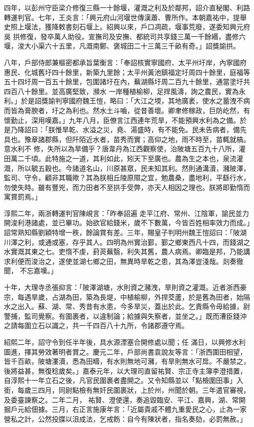 \begin{pinyinscope}
 四年，以彭州守臣梁介修復三縣一十餘堰，灌溉之利及於鄰邦，詔介直秘閣、利路轉運判官。七年，王炎言：「興元府山河堰世傳漢蕭、曹所作。本朝嘉祐中，提舉史照上堰法，獲降敕書刻石堰上。紹興以來，戶口凋疏，堰事荒廢，遂委知興元府吳
 拱修復，發卒萬人助役。宣撫司及安撫、都統司共享錢三萬一千餘緡，盡修六堰，浚大小渠六十五里，凡溉南鄭、褒城田二十三萬三千畝有奇。」詔獎諭拱。



 八年，戶部侍郎兼樞密都承旨葉衡言：「奉詔核實寧國府、太平州圩岸，內寧國府惠民、化城舊圩四十餘里，新築九里餘；太平州黃池鎮福定圩周四十餘里，庭福等五十四圩周一百五十餘里，包圍諸圩在內，蕪湖縣圩周二百九十餘里，通當塗圩共四百八十餘里。並高廣堅致，瀕水
 一岸種植榆柳，足捍風濤，詢之農民，實為永利。」於是詔獎諭判寧國府魏王愷，略曰：「大江之堧，其地廣袤，使水之蓄洩不病而皆為膏腴者，圩之為利也。然水土斗嚙，從昔善壞。卿聿修稼政，巨防屹然，有懷勤止，深用嘆嘉。」九年八月，臣僚言江西連年荒旱，不能預興水利為之備。於是乃降詔曰：「朕惟旱乾、水溢之災，堯、湯盛時，有不能免。民未告病者，備先具也。豫章諸郡縣，但阡陌近水者，苗秀而實；高仰之地，雨不時至，苗輒就槁。意水利不
 修，失所以為旱備乎？唐韋丹為江西觀察使，治陂塘五百九十八所，灌田萬二千頃。此特施之一道，其利如此，矧天下至廣也。農為生之本也，泉流灌溉，所以毓五穀也。今諸道名山，川原甚眾，民未知其利。然則通溝瀆，瀦陂澤，監司、守令，顧非其職歟？其為朕相丘陵原隰之宜，勉農桑，盡地利，平繇行水，勿使失時。雖有豐兇，而力田者不至拱手受弊，亦天人相因之理也。朕將即勤惰而寓賞罰焉。」



 淳熙二年，兩浙轉運判官陳峴言：「昨奉詔遍
 走平江府、常州、江陰軍，諭民並力開浚利港諸處，並已畢功。始欲官給錢米，歲不下數萬，今皆百姓相率效力而成。」詔常熟知縣劉穎特增一秩，餘論賞有差。三年，賜皇子判明州魏王愷詔曰：「陂湖川澤之利，或通或塞，存乎其人。四明為州實治鄞，鄞之鄉東西凡十四，而錢湖之水實溉其東之七。吏惰不虔，葑菼蕪翳，利失其舊，農人病焉。卿臨是邦，乃能講求利便而浚治之，遂使並湖七鄉之田，無異時旱乾之患，其為澤豈淺哉。剡奏徹聞，
 不忘嘉嘆。」



 十年，大理寺丞張抑言：「陂澤湖塘，水則資之瀦洩，旱則資之灌溉。近者浙西豪宗，每遇旱歲，占湖為田，築為長堤，中植榆柳，外捍茭蘆，於是舊為田者，始隔水之出入。蘇、湖、常、秀昔有水患，今多旱災，蓋出於此。乞責縣令毋給據，尉警捕，監司覺察。有圍裹者，以違制論；給據與失察者，並坐之。」既而漕臣錢沖之請每圍立石以識之，共一千四百八十九所，令諸郡遵守焉。



 紹熙二年，詔守令到任半年後，具水源湮塞合開修處以聞；任
 滿日，以興修水利圖進，擇其勞效著明者賞之。慶元二年，戶部尚書袁說友等言：「浙西圍田相望，皆千百畝，陂塘漊瀆，悉為田疇，有水則無地可瀦，有旱則無水可戽。不嚴禁之，後將益甚，無復稔歲矣。」嘉泰元年，以大理司直留祐賢、宗正寺主簿李澄措置，自淳熙十一年立石之後，凡官民圍裹者盡開之。又令知縣並以「點檢圍田事」入銜，每歲三四月，同尉點檢有無奸民圍裹狀，上於州，州聞於朝。三年遣官審視，及委臺諫察之。二年二月，
 祐賢、澄使還，奏追毀臨安、平江、嘉興，湖、常開掘戶元給佃據。三月，右正言施康年言：「近屬貴戚不體九重愛民之心，止為一家營私之計，公然投牒以沮成法，乞戒飭：自今有陳狀者，指名奏劾，必罰無赦。」




\end{pinyinscope}
